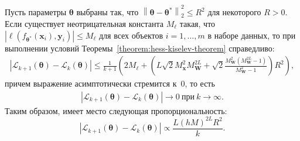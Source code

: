\begin{theorem}\label{chapter:complex:theorem-kiselev-loss}
    Пусть параметры $\boldsymbol{\theta}$ выбраны так, что $\left\|\boldsymbol{\theta} - \boldsymbol{\theta}^*\right\|_2^2 \leqslant R^2$ для некоторого $R > 0$. Если существует неотрицательная константа $M_{\ell}$ такая, что $\left| \ell(f_{\boldsymbol{\theta}^*}(\mathbf{x}_{i}), \mathbf{y}_{i}) \right| \leqslant M_{\ell}$ для всех объектов $i = 1, \ldots, m$ в наборе данных, то при выполнении условий Теоремы~\ref{theorem:hess-kiselev-theorem} справедливо:
    \begin{align}
        \left| \mathcal{L}_{k+1}(\boldsymbol{\theta}) - \mathcal{L}_k(\boldsymbol{\theta}) \right| \leqslant \frac{1}{k+1}\left( 2M_{\ell} + \left( L \sqrt{2} M_{\mathbf{x}}^2 M_{\mathbf{W}}^{2L} + \sqrt{2} \frac{M_{\mathbf{W}}^2 (M_{\mathbf{W}}^{2L} - 1)}{M_{\mathbf{W}}^2 - 1} \right) R^2 \right),
    \end{align}
    причем выражение асимптотически стремится к~$0$, то есть
    \begin{align}
        \left| \mathcal{L}_{k+1}(\boldsymbol{\theta}) - \mathcal{L}_k(\boldsymbol{\theta}) \right| \to 0~\text{при}~k \to \infty.
    \end{align}
    Таким образом, имеет место следующая пропорциональность:
    \begin{equation}\label{ch1lc:eq:rate-loss-conv}
        \left| \mathcal{L}_{k+1}(\boldsymbol{\theta}) - \mathcal{L}_k(\boldsymbol{\theta}) \right| \propto \frac{L (hM)^{2L} R^2}{k}.
    \end{equation}
\end{theorem}
